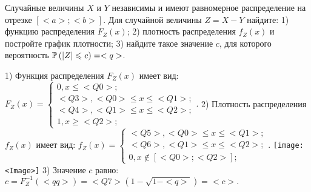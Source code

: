 \documentclass{article}%
\begin{document}
\begin{problem}
Случайные величины $X$ и $Y$ независимы и имеют равномерное
распределение на отрезке $[<a>;<b>]$. Для случайной величины $Z=X-Y$ найдите:
1) функцию распределения $F_Z(x)$;
2) плотность распределения $f_Z(x)$ и постройте график плотности;
3) найдите такое значение $c$, для которого вероятность $\P(|Z|\leqslant c)=<q>$.
\end{problem}

\begin{solution*}
1) Функция распределения $F_Z(x)$ имеет вид:
$
F_Z(x)=\left\{
\begin{array}{l}
0, x\leqslant <Q0>;\\
<Q3>, <Q0>\leqslant x\leqslant <Q1>;\\
<Q4>, <Q1>\leqslant x\leqslant <Q2>;\\
1, x\geqslant <Q2>;
\end{array}.
\right.
$
2) Плотность распределения $f_Z(x)$ имеет вид:
$
f_Z(x)=\left\{
\begin{array}{l}
<Q5>, <Q0>\leqslant x\leqslant <Q1>;\\
<Q6>, <Q1>\leqslant x\leqslant <Q2>;\\
0, x\not\in [<Q0>;<Q2>];
\end{array}.
\right.
$
\texttt{[image: <Image>]}
3) Значение $c$ равно:
$
c=F_Z^{-1}(<qq>)=<Q7>\left(1-\sqrt{1-<q>}\right)=
<c>.
$
\end{solution*}
\end{document}

